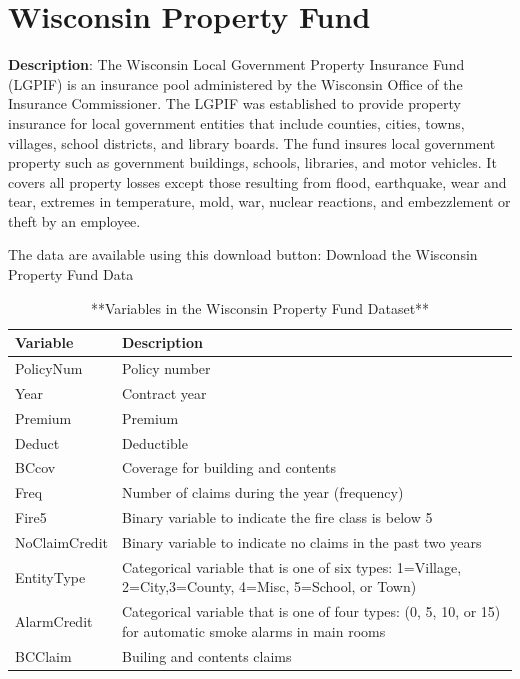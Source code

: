 \documentclass[
]{book}
\begin{document}
\hypertarget{S:WiscPropFundA}{%
\section{Wisconsin Property Fund}\label{S:WiscPropFundA}}

\textbf{Description}: The Wisconsin Local Government Property Insurance Fund (LGPIF) is an insurance pool administered by the Wisconsin Office of the Insurance Commissioner. The LGPIF was established to provide property insurance for local government entities that include counties, cities, towns, villages, school districts, and library boards. The fund insures local government property such as government buildings, schools, libraries, and motor vehicles. It covers all property losses except those resulting from flood, earthquake, wear and tear, extremes in temperature, mold, war, nuclear reactions, and embezzlement or theft by an employee.

The data are available using this download button:
Download the Wisconsin Property Fund Data

\begin{table}

\caption{\label{tab:unnamed-chunk-27}**Variables in the Wisconsin Property Fund Dataset**}
\centering
\begin{tabular}[t]{ll}
\toprule
Variable & Description\\
\midrule
PolicyNum & Policy number\\
Year & Contract year\\
Premium & Premium\\
Deduct & Deductible\\
BCcov & Coverage for building and contents\\
\addlinespace
Freq & Number of claims during the year (frequency)\\
Fire5 & Binary variable to indicate the fire class is below 5\\
NoClaimCredit & Binary variable to indicate no claims in the past two years\\
EntityType & Categorical variable that is one of six types:  1=Village, 2=City,3=County, 4=Misc, 5=School, or Town)\\
AlarmCredit & Categorical variable that is one of four types:  (0, 5, 10, or 15) for automatic smoke alarms in main rooms\\
\addlinespace
BCClaim & Builing and contents claims\\
\bottomrule
\end{tabular}
\end{table}
\end{document}
